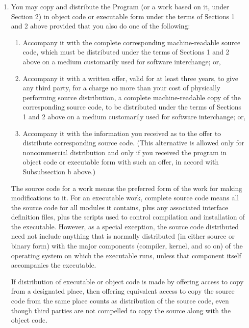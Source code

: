 \documentclass{article}
\begin{document}
\begin{enumerate}
\item
You may copy and distribute the Program (or a work based on it,
under Section 2) in object code or executable form under the terms of
Sections 1 and 2 above provided that you also do one of the following:

\begin{enumerate}

\item
Accompany it with the complete corresponding machine-readable
source code, which must be distributed under the terms of Sections
1 and 2 above on a medium customarily used for software interchange; or,

\item
Accompany it with a written offer, valid for at least three
years, to give any third party, for a charge no more than your
cost of physically performing source distribution, a complete
machine-readable copy of the corresponding source code, to be
distributed under the terms of Sections 1 and 2 above on a medium
customarily used for software interchange; or,

\item
Accompany it with the information you received as to the offer
to distribute corresponding source code.  (This alternative is
allowed only for noncommercial distribution and only if you
received the program in object code or executable form with such
an offer, in accord with Subsubsection b above.)

\end{enumerate}


The source code for a work means the preferred form of the work for
making modifications to it.  For an executable work, complete source
code means all the source code for all modules it contains, plus any
associated interface definition files, plus the scripts used to
control compilation and installation of the executable.  However, as a
special exception, the source code distributed need not include
anything that is normally distributed (in either source or binary
form) with the major components (compiler, kernel, and so on) of the
operating system on which the executable runs, unless that component
itself accompanies the executable.

If distribution of executable or object code is made by offering
access to copy from a designated place, then offering equivalent
access to copy the source code from the same place counts as
distribution of the source code, even though third parties are not
compelled to copy the source along with the object code.


\end{enumerate}
\end{document}
